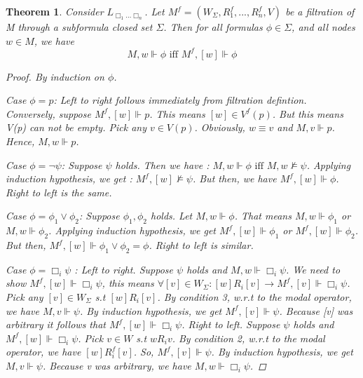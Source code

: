 \documentclass[12pt, a4paper]{scrartcl}
\newtheorem{theorem}[definition]{Theorem}
\begin{document}
\begin{theorem}
    Consider $L_{\Box_1...\Box_n}$. Let $M^f =(W_\Sigma, R^f_1,...,R^f_n, V)$ be a filtration of M through a subformula closed set $\Sigma$.
    Then for all formulas $\phi \in \Sigma$, and all nodes $w \in M$, we have $$M,w \Vdash \phi \mbox{ iff } M^f,[w] \Vdash \phi$$
    
    \begin{proof}
        By induction on $\phi$.\newline
        
        Case $\phi = p$: Left to right follows immediately from filtration defintion. Conversely, suppose
        $M^f, [w] \Vdash p$. This means $ [w] \in V^f(p)$. But this means V(p) can not be empty. Pick any $v\in V(p)$. Obviously, $w\equiv v$ and
        $M,v\Vdash p$. Hence, $M,w \Vdash p$. \newline
        
        Case $\phi = \neg \psi$: Suppose $\psi$ holds. Then we have : $M,w \Vdash \phi \mbox{ iff } M,w \nvDash \psi$. Applying 
        induction hypothesis, we get : $M^f, [w] \nvDash \psi$. But then, we have $M^f, [w] \Vdash \phi$. Right to left is the same. \newline
        
        Case $\phi = \phi_1 \lor \phi_2$: Suppose $\phi_1, \phi_2$ holds. Let $M,w \Vdash \phi$. That means $M,w \Vdash \phi_1$ or $M,w \Vdash \phi_2$. Applying
        induction hypothesis, we get $M^f,[w] \Vdash \phi_1$ or $M^f,[w] \Vdash \phi_2$. But then, $M^f,[w] \Vdash \phi_1 \lor \phi_2 = \phi$. Right to left is similar. \newline
        
        Case $\phi = \Box_i\psi$ : Left to right. Suppose $\psi$ holds and  $M,w \Vdash \Box_i \psi$. 
        We need to show $M^f,[w] \Vdash \Box_i \psi$, this means $\forall [v] \in W_\Sigma : [w]R_i[v] \rightarrow M^f,[v] \Vdash \Box_i \psi$. Pick any $[v] \in W_\Sigma$ s.t 
        $[w]R_i[v]$. By condition 3, w.r.t to the modal operator, we have $M,v \Vdash \psi$. By induction hypothesis, we get $M^f,[v] \Vdash \psi$. Because [v] was arbitrary it follows that $M^f,[w] \Vdash \Box_i \psi$. \newline \newline
        Right to left. Suppose $\psi$ holds and $M^f,[w] \Vdash \Box_i \psi$. Pick $v \in W$ s.t $wR_iv$. By condition 2, w.r.t to the modal operator, we have
        $[w]R^f_i[v]$. So, $M^f, [v] \Vdash \psi$. By induction hypothesis, we get $M,v \Vdash \psi$. Because v was arbitrary, we have $M,w \Vdash \Box_i \psi$.

    
    \end{proof}     
\end{theorem}
\end{document}
